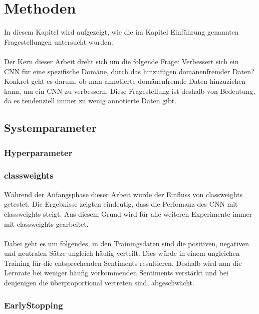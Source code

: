 \chapter{Methoden}
\label{methods}
In diesem Kapitel wird aufgezeigt, wie die im Kapitel Einführung genannten Fragestellungen untersucht wurden.\\\\
Der Kern dieser Arbeit dreht sich um die folgende Frage: Verbessert sich ein CNN für eine spezifische Domäne, durch das hinzufügen domänenfremder Daten?
Konkret geht es darum, ob man annotierte domänenfremde Daten hinzuziehen kann, um ein CNN zu verbessern. Diese Fragestellung ist deshalb von Bedeutung, da es tendenziell immer zu wenig annotierte Daten gibt.
\section{Systemparameter}
\subsection{Hyperparameter}
\subsection{classweights}
Während der Anfangsphase dieser Arbeit wurde der Einfluss von classweights getestet. Die Ergebnisse zeigten eindeutig, dass die Perfomanz des CNN mit classweights steigt. Aus diesem Grund wird für alle weiteren Experimente immer mit classweights gearbeitet.\\\\
Dabei geht es um folgendes, in den Trainingsdaten sind die positiven, negativen und neutralen Sätze ungleich häufig verteilt. Dies würde in einem ungleichen Training für die entsprechenden Sentiments resultieren. Deshalb wird nun die Lernrate bei weniger häufig vorkommenden Sentiments verstärkt und bei denjenigen die überproportional vertreten sind, abgeschwächt.
\subsection{EarlyStopping}

